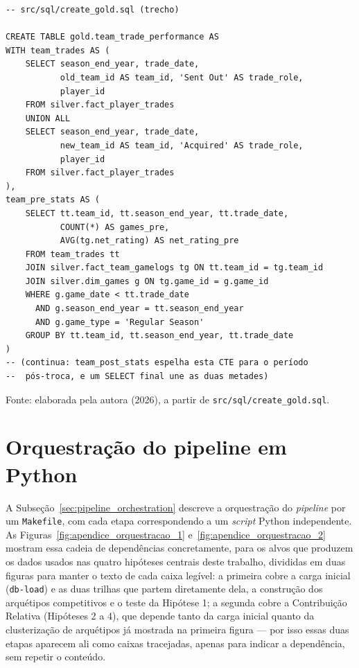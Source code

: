 \begin{codelisting}[htb]
\makeatletter
{}
\makeatother
\label{cod:sql_gold}
\begin{verbatim}
-- src/sql/create_gold.sql (trecho)

CREATE TABLE gold.team_trade_performance AS
WITH team_trades AS (
    SELECT season_end_year, trade_date,
           old_team_id AS team_id, 'Sent Out' AS trade_role,
           player_id
    FROM silver.fact_player_trades
    UNION ALL
    SELECT season_end_year, trade_date,
           new_team_id AS team_id, 'Acquired' AS trade_role,
           player_id
    FROM silver.fact_player_trades
),
team_pre_stats AS (
    SELECT tt.team_id, tt.season_end_year, tt.trade_date,
           COUNT(*) AS games_pre,
           AVG(tg.net_rating) AS net_rating_pre
    FROM team_trades tt
    JOIN silver.fact_team_gamelogs tg ON tt.team_id = tg.team_id
    JOIN silver.dim_games g ON tg.game_id = g.game_id
    WHERE g.game_date < tt.trade_date
      AND g.season_end_year = tt.season_end_year
      AND g.game_type = 'Regular Season'
    GROUP BY tt.team_id, tt.season_end_year, tt.trade_date
)
-- (continua: team_post_stats espelha esta CTE para o período
--  pós-troca, e um SELECT final une as duas metades)
\end{verbatim}
\begin{flushleft}
\footnotesize Fonte: elaborada pela autora (2026), a partir de \texttt{src/sql/create\_gold.sql}.
\end{flushleft}
\end{codelisting}

\section{Orquestração do pipeline em Python}
\label{sec:apendice_orquestracao}

A Subseção~\ref{sec:pipeline_orchestration} descreve a orquestração do \textit{pipeline} por um \texttt{Makefile}, com cada etapa correspondendo a um \textit{script} Python independente. As Figuras~\ref{fig:apendice_orquestracao_1} e~\ref{fig:apendice_orquestracao_2} mostram essa cadeia de dependências concretamente, para os alvos que produzem os dados usados nas quatro hipóteses centrais deste trabalho, divididas em duas figuras para manter o texto de cada caixa legível: a primeira cobre a carga inicial (\texttt{db-load}) e as duas trilhas que partem diretamente dela, a construção dos arquétipos competitivos e o teste da Hipótese 1; a segunda cobre a Contribuição Relativa (Hipóteses 2 a 4), que depende tanto da carga inicial quanto da clusterização de arquétipos já mostrada na primeira figura — por isso essas duas etapas aparecem ali como caixas tracejadas, apenas para indicar a dependência, sem repetir o conteúdo.

